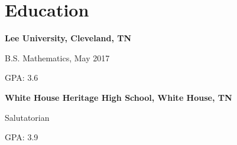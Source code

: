 \section{\sc Education}
{\bf Lee University, Cleveland, TN}
\begin{list1}
\item[] B.S. Mathematics, May 2017
\item[] GPA: 3.6
\end{list1}
{\bf White House Heritage High School, White House, TN}
\begin{list2}
\item[] Salutatorian
\item[] GPA: 3.9
\end{list2}
\endinput